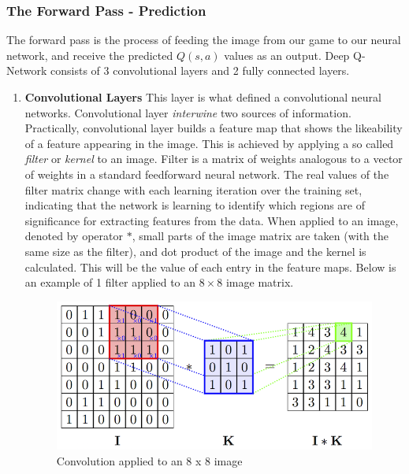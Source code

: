     \subsubsection{The Forward Pass - Prediction}
    The forward pass is the process of feeding the image from our game to our neural network, and receive the predicted $Q(s,a)$ values as an output. Deep Q-Network consists of 3 convolutional layers and 2 fully connected layers. 
    \begin{enumerate}
        \item \textbf{Convolutional Layers}
        This layer is what defined a convolutional neural networks. Convolutional layer \textit{interwine} two sources of information. Practically, convolutional layer builds a feature map that shows the likeability of a feature appearing in the image. This is achieved by applying a so called \textit{filter} or \textit{kernel} to an image. Filter is a matrix of weights analogous to a vector of weights in a standard feedforward neural network. The real values of the filter matrix change with each learning iteration over the training set, indicating that the network is learning to identify which regions are of significance for extracting features from the data. When applied to an image, denoted by operator $*$, small parts of the image matrix are taken (with the same size as the filter), and dot product of the image and the kernel is calculated. This will be the value of each entry in the feature maps. Below is an example of 1 filter applied to an $8 \times 8$ image matrix. 
        \begin{figure}[H]
        \centering
        \includegraphics[scale=1.2]{images/convolve.png}
        \caption{Convolution applied to an 8 x 8 image}
        \label{fig:45}
        \end{figure}
        


\end{enumerate}
